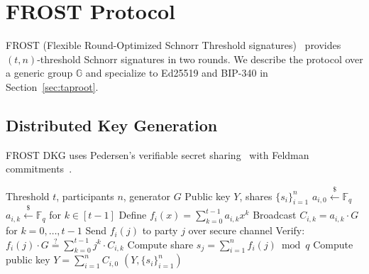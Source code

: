 

\section{FROST Protocol}

\label{sec:frost}

FROST (Flexible Round-Optimized Schnorr Threshold signatures)~\cite{komlo2020frost}
provides $(t,n)$-threshold Schnorr signatures in two rounds. We describe the protocol
over a generic group $\mathbb{G}$ and specialize to Ed25519 and BIP-340 in
Section~\ref{sec:taproot}.

\subsection{Distributed Key Generation}

FROST DKG uses Pedersen's verifiable secret sharing~\cite{pedersen1991} with
Feldman commitments~\cite{feldman1987}.

\begin{algorithm}[H]
\caption{FROST Distributed Key Generation}
\label{alg:frost-dkg}
\begin{algorithmic}[1]
\Require Threshold $t$, participants $n$, generator $G$
\Ensure Public key $Y$, shares $\{s_i\}_{i=1}^n$
  \State $a_{i,0} \xleftarrow{\$} \mathbb{F}_q$ 
  \State $a_{i,k} \xleftarrow{\$} \mathbb{F}_q$ for $k \in [t-1]$
  \State Define $f_i(x) = \sum_{k=0}^{t-1} a_{i,k} x^k$
  \State Broadcast $C_{i,k} = a_{i,k} \cdot G$ for $k = 0, \ldots, t-1$
  \State Send $f_i(j)$ to party $j$ over secure channel
\EndFor
{}
  \State Verify: $f_i(j) \cdot G \stackrel{?}{=} \sum_{k=0}^{t-1} j^k \cdot C_{i,k}$
  \State Compute share $s_j = \sum_{i=1}^n f_i(j) \bmod q$
  \State Compute public key $Y = \sum_{i=1}^n C_{i,0}$
\EndFor
\State \Return $(Y, \{s_i\}_{i=1}^n)$
\end{algorithmic}
\end{algorithm}

